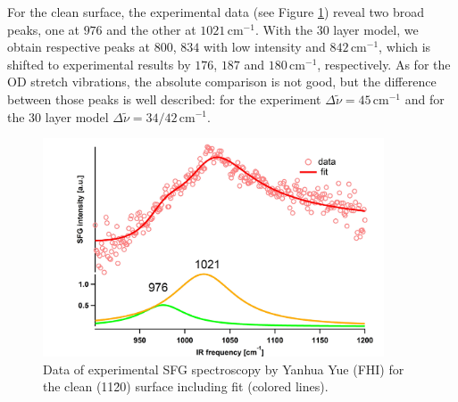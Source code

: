 \documentclass[11pt,DIV=13,BCOR=5mm,a4paper,headinclude]{scrbook}
\begin{document}
For the clean surface, the experimental data (see Figure \ref{abb:exp-sfg_clean}) reveal two broad peaks, one at $976$ and the other at $1021\,$cm$^{-1}$.
With the 30 layer model, we obtain respective peaks at $800$, $834$ with low intensity and $842\,$cm$^{-1}$, which is shifted to experimental results by $176$, $187$ and $180\,$cm$^{-1}$, respectively.
As for the OD stretch vibrations, the absolute comparison is not good, but the difference between those peaks is well described: for the experiment $\Delta \tilde{\nu}=45\,$cm$^{-1}$ and for the 30 layer model $\Delta \tilde{\nu}=34/42\,$cm$^{-1}$.
\begin{figure}[!ht]
 \centering
\includegraphics[width=0.9\textwidth]{figures/11-20/ssp_UHV_800K_fit_clean.jpg}
 \caption{Data of experimental SFG spectroscopy by Yanhua Yue (FHI) for the clean (11\=20) surface including fit (colored lines).}
        \label{abb:exp-sfg_clean}
 \end{figure}
\end{document}
